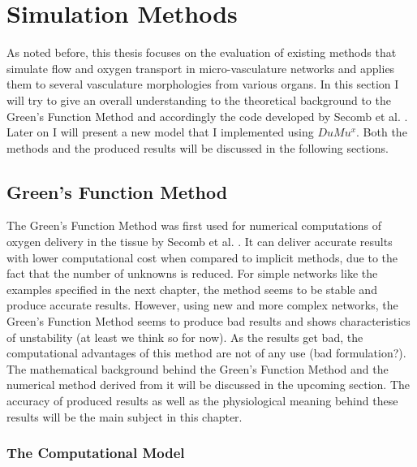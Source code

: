 \newpage
\section{Simulation Methods}

As noted before, this thesis focuses on the evaluation of existing
methods that simulate flow and oxygen transport in micro-vasculature networks
and applies them to several vasculature morphologies from various organs. In this section I will try to give an overall understanding to the theoretical background to the Green's Function Method and accordingly the code developed by Secomb et al. \cite{Secomb2004}. Later on I will present a new model that I implemented using $DuMu^x$. Both the methods and the produced results will be discussed in the following sections.

\subsection{Green's Function Method}

The Green's Function Method was first used for numerical computations of oxygen delivery in the tissue by Secomb et al. \cite{Secomb2004}. It can deliver accurate results with lower computational cost when compared to implicit methods, due to the fact that the number of unknowns is reduced. For simple networks like the examples specified in the next chapter, the method seems to be stable and produce accurate results. However, using new and more complex networks, the Green's Function Method seems to produce bad results and shows characteristics of unstability (at least we think so for now). As the results get bad, the computational advantages of this method are not of any use (bad formulation?).
\\The mathematical background behind the Green's Function Method and the numerical method derived from it will be discussed in the upcoming section. The accuracy of produced results as well as the physiological meaning behind these results will be the main subject in this chapter.

\subsubsection{The Computational Model}

